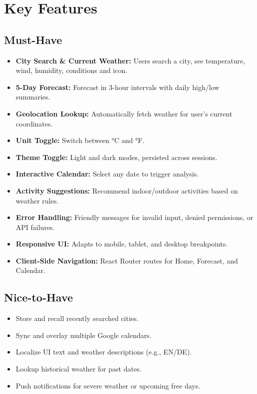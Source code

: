 \documentclass[fontsize=13pt,a4paper]{scrartcl}
\begin{document}
\section{Key Features}

\subsection*{Must-Have}
\begin{itemize}[nosep]
  \item \textbf{City Search \& Current Weather:} Users search a city, see temperature, wind, humidity, conditions and icon.
  \item \textbf{5-Day Forecast:} Forecast in 3-hour intervals with daily high/low summaries.
  \item \textbf{Geolocation Lookup:} Automatically fetch weather for user’s current coordinates.
  \item \textbf{Unit Toggle:} Switch between °C and °F.
  \item \textbf{Theme Toggle:} Light and dark modes, persisted across sessions.
  \item \textbf{Interactive Calendar:} Select any date to trigger analysis.
  \item \textbf{Activity Suggestions:} Recommend indoor/outdoor activities based on weather rules.
  \item \textbf{Error Handling:} Friendly messages for invalid input, denied permissions, or API failures.
  \item \textbf{Responsive UI:} Adapts to mobile, tablet, and desktop breakpoints.
  \item \textbf{Client-Side Navigation:} React Router routes for Home, Forecast, and Calendar.
\end{itemize}

\subsection*{Nice-to-Have}
\begin{itemize}[nosep]
  \item Store and recall recently searched cities.
  \item Sync and overlay multiple Google calendars.
  \item Localize UI text and weather descriptions (e.g., EN/DE).
  \item Lookup historical weather for past dates.
  \item Push notifications for severe weather or upcoming free days.
\end{itemize}
\end{document}

